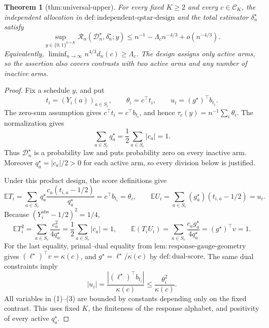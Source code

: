 \documentclass{article}
\newtheorem{theorem}{Theorem}
\begin{document}
\begin{theorem}[thm:universal-upper]\label{thm:universal-upper}
For every fixed \(K\ge2\) and every \(c\in\mathcal C_K\), the independent allocation in \(\mathrm{def:independent\text{-}qstar\text{-}design}\) and the total estimator \(\delta_n^\star\) satisfy
\[
\sup_{y\in\{0,1\}^{n\times K}}\mathcal R_n(\mathcal D_n^\star,\delta_n^\star;y)
\le n^{-1}-\Lambda_cn^{-4/3}+o(n^{-4/3}).
\]
Equivalently, \(\liminf_{n\to\infty}n^{4/3}d_n(c)\ge\Lambda_c\).  The design assigns only active arms, so the assertion also covers contrasts with two active arms and any number of inactive arms.
\end{theorem}
\begin{proof}
Fix a schedule \(y\), and put
\[
t_i=(Y_i(a))_{a\in S_c},\qquad
\theta_i=c^\top t_i,\qquad
u_i=(g^\star)^\top b_{t_i}.
\]
The zero-sum assumption gives \(c^\top t_i=c^\top b_{t_i}\), and hence
\(\tau_c(y)=n^{-1}\sum_i\theta_i\).  The normalization gives
\[
\sum_{a\in S_c}q_a^\star=\frac12\sum_{a\in S_c}|c_a|=1.
\]
Thus \(\mathcal D_n^\star\) is a probability law and puts probability zero on every inactive arm.  Moreover \(q_a^\star=|c_a|/2>0\) for each active arm, so every division below is justified.

Under this product design, the score definitions give
\[
\mathbb ET_i
=\sum_{a\in S_c}q_a^\star
\frac{c_a(t_{i,a}-1/2)}{q_a^\star}
=c^\top b_{t_i}=\theta_i,
\qquad
\mathbb EU_i
=\sum_{a\in S_c}(g_a^\star)(t_{i,a}-1/2)=u_i.
\tag{1}
\]
Because \((Y_i^{\mathrm{obs}}-1/2)^2=1/4\),
\[
\mathbb ET_i^2
=\sum_{a\in S_c}\frac{c_a^2}{4q_a^\star}
=\frac12\sum_{a\in S_c}|c_a|=1,
\qquad
\mathbb E(T_iU_i)
=\sum_{a\in S_c}\frac{c_ag_a^\star}{4q_a^\star}
=(g^\star)^\top v=1.
\tag{2}
\]
For the last equality, primal--dual equality from
\(\mathrm{lem:response\text{-}gauge\text{-}geometry}\) gives
\((\ell^\star)^\top v=\kappa(c)\), and
\(g^\star=\ell^\star/\kappa(c)\) by
\(\mathrm{def:dual\text{-}score}\).  The same dual constraints imply
\[
|u_i|
=\frac{|(\ell^\star)^\top b_{t_i}|}{\kappa(c)}
\le\frac{\theta_i^2}{\kappa(c)}.
\tag{3}
\]
All variables in (1)--(3) are bounded by constants depending only on the fixed contrast.  This uses fixed \(K\), the finiteness of the response alphabet, and positivity of every active \(q_a^\star\).


\end{proof}
\end{document}
